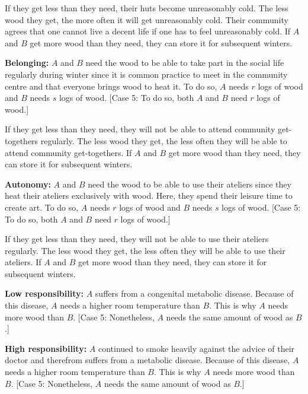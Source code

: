 \documentclass[egregdoesnotlikesansseriftitles]{scrartcl}
\begin{document}
If they get less than they need, their huts become unreasonably cold.
The less wood they get, the more often it will get unreasonably cold.
Their community agrees that one cannot live a decent life if one has to feel unreasonably cold.
If $A$ and $B$ get more wood than they need, they can store it for subsequent winters.\vspace{2ex}

\noindent\textbf{Belonging:} $A$ and $B$ need the wood to be able to take part in the social life regularly during winter since it is common practice to meet in the community centre and that everyone brings wood to heat it.
To do so, $A$ needs $r$ logs of wood and $B$ needs $s$ logs of wood.
[Case 5: To do so, both $A$ and $B$ need $r$ logs of wood.]

If they get less than they need, they will not be able to attend community get-togethers regularly.
The less wood they get, the less often they will be able to attend community get-togethers.
If $A$ and $B$ get more wood than they need, they can store it for subsequent winters.\vspace{2ex}

\noindent\textbf{Autonomy:} $A$ and $B$ need the wood to be able to use their ateliers since they heat their ateliers exclusively with wood.
Here, they spend their leisure time to create art.
To do so, $A$ needs $r$ logs of wood and $B$ needs $s$ logs of wood.
[Case 5: To do so, both $A$ and $B$ need $r$ logs of wood.]

If they get less than they need, they will not be able to use their ateliers regularly.
The less wood they get, the less often they will be able to use their ateliers.
If $A$ and $B$ get more wood than they need, they can store it for subsequent winters.\vspace{2ex}

\noindent\textbf{Low responsibility:} $A$ suffers from a congenital metabolic disease.
Because of this disease, $A$ needs a higher room temperature than $B$.
This is why $A$ needs more wood than $B$.
[Case 5: Nonetheless, $A$ needs the same amount of wood as $B$.]\vspace{2ex}

\noindent\textbf{High responsibility:}
$A$ continued to smoke heavily against the advice of their doctor and therefrom suffers from a metabolic disease.
Because of this disease, $A$ needs a higher room temperature than $B$.
This is why $A$ needs more wood than $B$.
[Case 5: Nonetheless, $A$ needs the same amount of wood as $B$.]\vspace{2ex}
\end{document}
